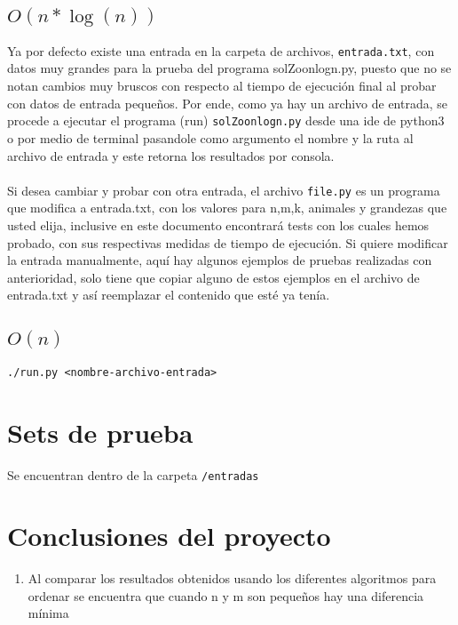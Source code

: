 \documentclass{article}
\begin{document}
		\subsection{$O(n*\log(n))$}		
		Ya por defecto existe una entrada en la carpeta de archivos, \texttt{entrada.txt}, con datos muy grandes para la prueba del programa solZoonlogn.py, puesto que no se notan cambios muy bruscos con respecto al tiempo de ejecución final al probar con datos de entrada pequeños. 
		Por ende, como ya hay un archivo de entrada, se procede a ejecutar el programa (run) \texttt{solZoonlogn.py} desde una ide de python3 o por medio de terminal pasandole como argumento el nombre y la ruta al archivo de entrada y este retorna los resultados por consola.\\\\
		Si desea cambiar y probar con otra entrada, el archivo \texttt{file.py} es un programa que modifica a entrada.txt, con los valores para n,m,k, animales y grandezas que usted elija, inclusive en este documento encontrará tests con los cuales hemos probado, con sus respectivas medidas de tiempo de ejecución. Si quiere modificar la entrada manualmente, aquí hay algunos ejemplos de pruebas realizadas con anterioridad, solo tiene que copiar alguno de estos ejemplos en el archivo de entrada.txt y así reemplazar el contenido que esté ya tenía.
		\subsection{$O(n)$}
			\texttt{./run.py <nombre-archivo-entrada>}
	\section{Sets de prueba}
		Se encuentran dentro de la carpeta \texttt{/entradas}
	\section{Conclusiones del proyecto}
	\begin{enumerate}
		\item Al comparar los resultados obtenidos usando los diferentes algoritmos para ordenar se encuentra que cuando n y m son pequeños hay una diferencia mínima
	\end{enumerate}
\end{document}
